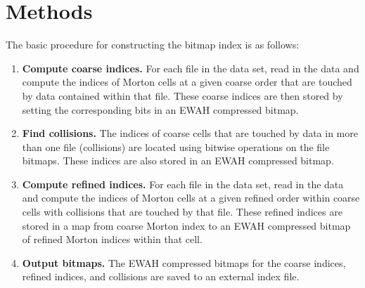 \documentclass[apjl]{emulateapj}
\begin{document}
\section{Methods}\label{S:methods}
The basic procedure for constructing the bitmap index is as follows:
\begin{enumerate}
\item {\bf Compute coarse indices.} For each file in the data set, read in the data and compute the indices of Morton cells at a given coarse order that are touched by data contained within that file. These coarse indices are then stored by setting the corresponding bits in an EWAH compressed bitmap.
\item {\bf Find collisions.} The indices of coarse cells that are touched by data in more than one file (collisions) are located using bitwise operations on the file bitmaps. These indices are also stored in an EWAH compressed bitmap.
\item {\bf Compute refined indices.} For each file in the data set, read in the data and compute the indices of Morton cells at a given refined order within coarse cells with collisions that are touched by that file. These refined indices are stored in a map from coarse Morton index to an EWAH compressed bitmap of refined Morton indices within that cell.
\item {\bf Output bitmaps.} The EWAH compressed bitmaps for the coarse indices, refined indices, and collisions are saved to an external index file.
\end{enumerate}
\end{document}
